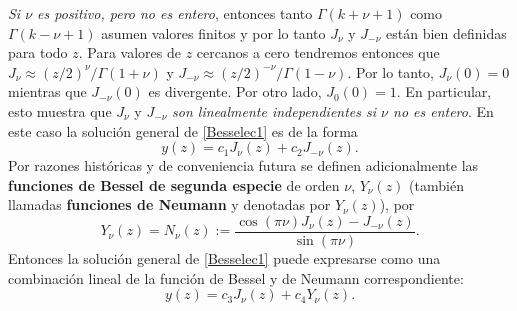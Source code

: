 \textit{Si $\nu$ es positivo, pero no es entero}, entonces tanto $\Gamma(k+\nu+1)$ como $\Gamma(k-\nu+1)$ asumen valores finitos y por lo tanto $J_\nu$ y $J_{-\nu}$ están bien definidas para todo $z$. Para valores de $z$ cercanos a cero tendremos entonces que $J_\nu\approx (z/2)^\nu/\Gamma(1+\nu)$ y $J_{-\nu}\approx (z/2)^{-\nu}/\Gamma(1-\nu)$. Por lo tanto, $J_\nu(0)=0$ mientras que  $J_{-\nu}(0)$ es divergente. Por otro lado, $J_0(0)=1$. En particular, esto muestra que $J_\nu$ y $J_{-\nu}$ \textit{son linealmente independientes si $\nu$ no es entero}.
En este caso la solución general de \eqref{Besselec1} es de la forma
\begin{equation}
y(z)=c_1J_\nu(z)+c_2J_{-\nu}(z).
\end{equation}
Por razones históricas y de conveniencia futura se definen adicionalmente las \textbf{funciones de Bessel de segunda especie} de orden $\nu$, $Y_\nu(z)$ (también llamadas \textbf{funciones de Neumann} y denotadas por $Y_\nu(z)$), por
\begin{equation}
\boxed{Y_\nu(z)=N_\nu(z):=\frac{\cos(\pi\nu)J_\nu(z)-J_{-\nu}(z)}{\sin(\pi\nu)}.}
\end{equation}
Entonces la solución general de \eqref{Besselec1} puede expresarse como una combinación lineal de la función de Bessel y de Neumann correspondiente:
\begin{equation}
y(z)=c_3J_\nu(z)+c_4Y_\nu(z).
\end{equation}

